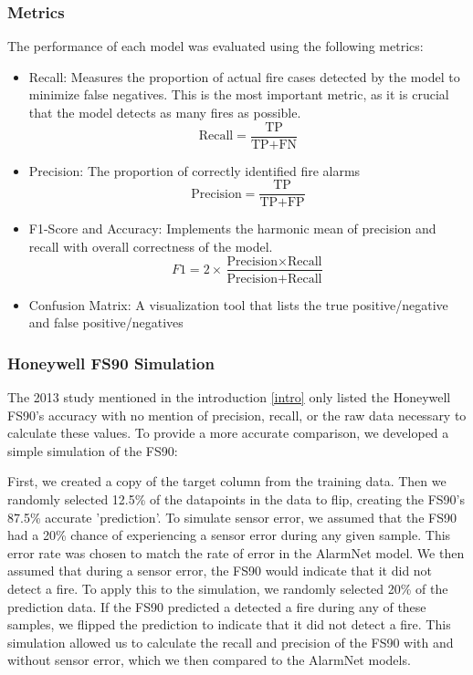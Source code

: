 \documentclass[conference]{IEEEtran}
\begin{document}
\subsubsection{Metrics}
The performance of each model was evaluated using the
following metrics:
\begin{itemize}
    \item Recall: Measures the proportion of actual fire
    cases detected by the model to minimize false negatives.
    This is the most important metric, as it is crucial that
    the model detects as many fires as possible.
    \begin{equation}
        \text{Recall} = \frac{\text{TP}}{\text{TP} + \text{FN}}
    \end{equation}
    \item Precision: The proportion of correctly identified
    fire alarms
    \begin{equation}
        \text{Precision} = \frac{\text{TP}}{\text{TP} + \text{FP}}
    \end{equation}
    \item F1-Score and Accuracy: Implements the harmonic
    mean of precision and recall with overall correctness of
    the model.
    \begin{equation}
        F1 = 2 \times \frac{\text{Precision} \times \text{Recall}}{\text{Precision} + \text{Recall}}
    \end{equation}
    \item Confusion Matrix: A visualization tool that lists
    the true positive/negative and false positive/negatives
\end{itemize}

\subsubsection{Honeywell FS90 Simulation}
The 2013 study mentioned in the introduction \ref{intro}
only listed the Honeywell FS90's accuracy with no mention of
precision, recall, or the raw data necessary to calculate
these values. To provide a more accurate comparison, we
developed a simple simulation of the FS90:

First, we created a copy of the target column from the
training data. Then we randomly selected 12.5\% of the
datapoints in the data to flip, creating the FS90's 87.5\%
accurate 'prediction'. To simulate sensor error, we assumed
that the FS90 had a 20\% chance of experiencing a sensor
error during any given sample. This error rate was chosen to
match the rate of error in the AlarmNet model. We then
assumed that during a sensor error, the FS90 would indicate
that it did not detect a fire. To apply this to the
simulation, we randomly selected 20\% of the prediction
data. If the FS90 predicted a detected a fire during any of
these samples, we flipped the prediction to indicate that it
did not detect a fire. This simulation allowed us to
calculate the recall and precision of the FS90 with and
without sensor error, which we then compared to the AlarmNet
models.
\end{document}
